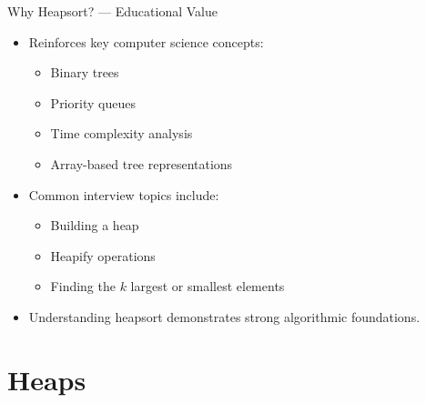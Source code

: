 \documentclass[14pt,aspectratio=1610]{beamer}
\begin{document}
\begin{frame}{Why Heapsort? --- Educational Value}
\begin{itemize}
\item Reinforces key computer science concepts:
\begin{itemize}
\item Binary trees
\item Priority queues
\item Time complexity analysis
\item Array-based tree representations
\end{itemize}
\item Common interview topics include:
\begin{itemize}
\item Building a heap
\item Heapify operations
\item Finding the \(k\) largest or smallest elements
\end{itemize}
\item Understanding heapsort demonstrates strong algorithmic foundations.
\end{itemize}
\end{frame}


\section{Heaps}
\end{document}
